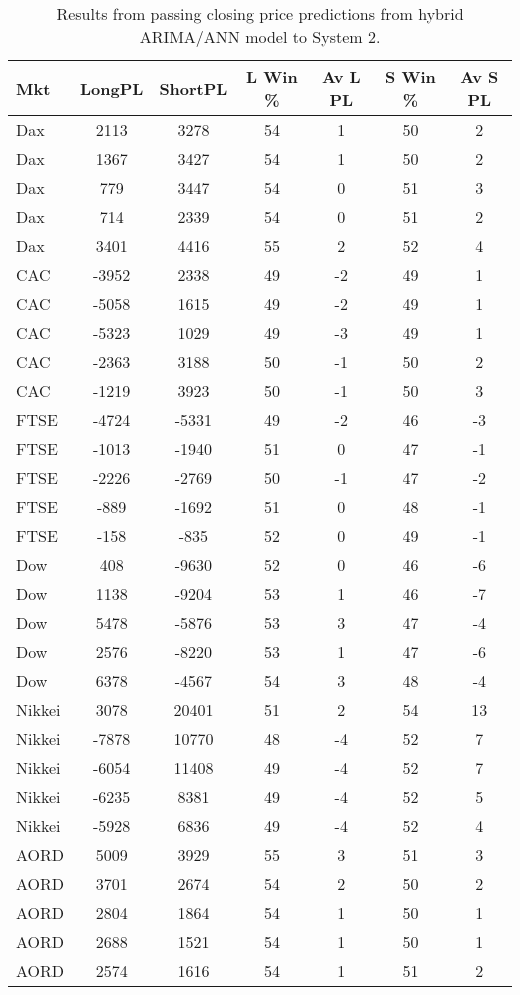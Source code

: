 \begin{table}[ht]
\centering
\caption[Results from passing closing price predictions from hybrid ARIMA/ANN model to System 2]{Results from passing closing price predictions from hybrid ARIMA/ANN model to System 2.} 
\label{tab:chp_ts:arima_ann_sys2}
\begin{tabular}{lcccccc}
  \toprule Mkt & LongPL & ShortPL & L Win \% & Av L PL & S Win \% & Av S PL \\ 
  \midrule Dax & 2113 & 3278 & 54 & 1 & 50 & 2 \\ 
  Dax & 1367 & 3427 & 54 & 1 & 50 & 2 \\ 
  Dax & 779 & 3447 & 54 & 0 & 51 & 3 \\ 
  Dax & 714 & 2339 & 54 & 0 & 51 & 2 \\ 
  Dax & 3401 & 4416 & 55 & 2 & 52 & 4 \\ 
  CAC & -3952 & 2338 & 49 & -2 & 49 & 1 \\ 
  CAC & -5058 & 1615 & 49 & -2 & 49 & 1 \\ 
  CAC & -5323 & 1029 & 49 & -3 & 49 & 1 \\ 
  CAC & -2363 & 3188 & 50 & -1 & 50 & 2 \\ 
  CAC & -1219 & 3923 & 50 & -1 & 50 & 3 \\ 
  FTSE & -4724 & -5331 & 49 & -2 & 46 & -3 \\ 
  FTSE & -1013 & -1940 & 51 & 0 & 47 & -1 \\ 
  FTSE & -2226 & -2769 & 50 & -1 & 47 & -2 \\ 
  FTSE & -889 & -1692 & 51 & 0 & 48 & -1 \\ 
  FTSE & -158 & -835 & 52 & 0 & 49 & -1 \\ 
  Dow & 408 & -9630 & 52 & 0 & 46 & -6 \\ 
  Dow & 1138 & -9204 & 53 & 1 & 46 & -7 \\ 
  Dow & 5478 & -5876 & 53 & 3 & 47 & -4 \\ 
  Dow & 2576 & -8220 & 53 & 1 & 47 & -6 \\ 
  Dow & 6378 & -4567 & 54 & 3 & 48 & -4 \\ 
  Nikkei & 3078 & 20401 & 51 & 2 & 54 & 13 \\ 
  Nikkei & -7878 & 10770 & 48 & -4 & 52 & 7 \\ 
  Nikkei & -6054 & 11408 & 49 & -4 & 52 & 7 \\ 
  Nikkei & -6235 & 8381 & 49 & -4 & 52 & 5 \\ 
  Nikkei & -5928 & 6836 & 49 & -4 & 52 & 4 \\ 
  AORD & 5009 & 3929 & 55 & 3 & 51 & 3 \\ 
  AORD & 3701 & 2674 & 54 & 2 & 50 & 2 \\ 
  AORD & 2804 & 1864 & 54 & 1 & 50 & 1 \\ 
  AORD & 2688 & 1521 & 54 & 1 & 50 & 1 \\ 
  AORD & 2574 & 1616 & 54 & 1 & 51 & 2 \\ 
   \bottomrule \end{tabular}
\end{table}
